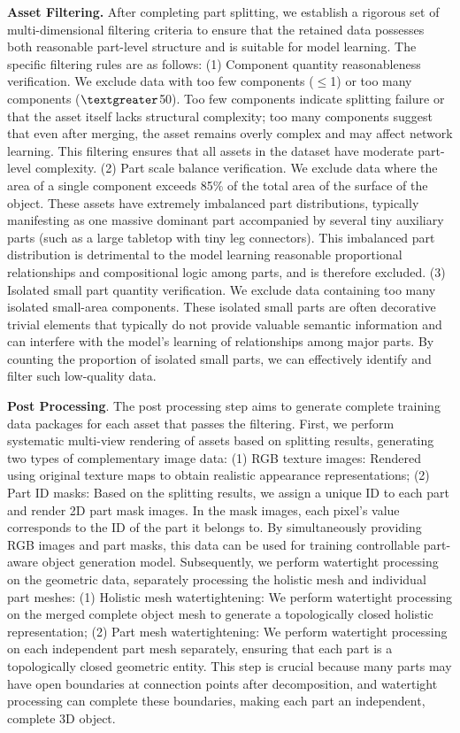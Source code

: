 \documentclass{article} %
\begin{document}
\textbf{Asset Filtering.} After completing part splitting, we establish a rigorous set of multi-dimensional filtering criteria to ensure that the retained data possesses both reasonable part-level structure and is suitable for model learning. The specific filtering rules are as follows: (1) Component quantity reasonableness verification. We exclude data with too few components ($\leq$1) or too many components ($\textgreater$50). Too few components indicate splitting failure or that the asset itself lacks structural complexity; too many components suggest that even after merging, the asset remains overly complex and may affect network learning. This filtering ensures that all assets in the dataset have moderate part-level complexity. (2) Part scale balance verification. We exclude data where the area of a single component exceeds 85\% of the total area of the surface of the object. These assets have extremely imbalanced part distributions, typically manifesting as one massive dominant part accompanied by several tiny auxiliary parts (such as a large tabletop with tiny leg connectors). This imbalanced part distribution is detrimental to the model learning reasonable proportional relationships and compositional logic among parts, and is therefore excluded. (3) Isolated small part quantity verification. We exclude data containing too many isolated small-area components. These isolated small parts are often decorative trivial elements that typically do not provide valuable semantic information and can interfere with the model's learning of relationships among major parts. By counting the proportion of isolated small parts, we can effectively identify and filter such low-quality data.

\textbf{Post Processing}. The post processing step aims to generate complete training data packages for each asset that passes the filtering. First, we perform systematic multi-view rendering of assets based on splitting results, generating two types of complementary image data: (1) RGB texture images: Rendered using original texture maps to obtain realistic appearance representations; (2) Part ID masks: Based on the splitting results, we assign a unique ID to each part and render 2D part mask images. In the mask images, each pixel's value corresponds to the ID of the part it belongs to. By simultaneously providing RGB images and part masks, this data can be used for training controllable part-aware object generation model. Subsequently, we perform watertight processing on the geometric data, separately processing the holistic mesh and individual part meshes: (1) Holistic mesh watertightening: We perform watertight processing on the merged complete object mesh to generate a topologically closed holistic representation; (2) Part mesh watertightening: We perform watertight processing on each independent part mesh separately, ensuring that each part is a topologically closed geometric entity. This step is crucial because many parts may have open boundaries at connection points after decomposition, and watertight processing can complete these boundaries, making each part an independent, complete 3D object.
\end{document}
